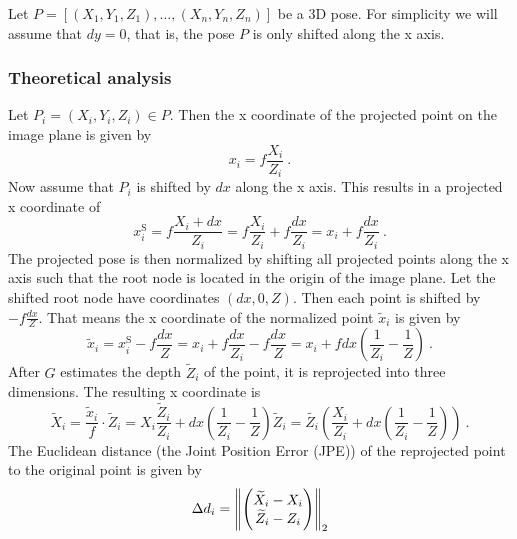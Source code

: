 Let $P = [(X_1, Y_1, Z_1), \dotsc, (X_n, Y_n, Z_n)]$ be a 3D pose.
For simplicity we will assume that $dy = 0$, that is, the pose $P$ is only shifted along the x axis.

\subsubsection{Theoretical analysis}
\label{sec:x-shift-error-theoretical}
Let $P_i = (X_i, Y_i, Z_i) \in P$.
Then the x coordinate of the projected point on the image plane is given by
\begin{equation}
	x_i = f \frac{X_i}{Z_i} \ .
\end{equation}
Now assume that $P_i$ is shifted by $dx$ along the x axis.
This results in a projected x coordinate of
\begin{equation}
	x_i^\mathrm{S} = f \frac{X_i + dx}{Z_i} = f \frac{X_i}{Z_i} + f \frac{dx}{Z_i} = x_i + f \frac{dx}{Z_i}\ .
\end{equation}
The projected pose is then normalized by shifting all projected points along the x axis such that the root node is located in the origin of the image plane.
Let the shifted root node have coordinates $(dx, 0, Z)$.
Then each point is shifted by $- f \frac{dx}{Z}$.
That means the x coordinate of the normalized point $\widetilde{x}_i$ is given by
\begin{equation}
	\widetilde{x}_i
	= x_i^\mathrm{S} - f \frac{dx}{Z}
	= x_i + f \frac{dx}{Z_i} - f \frac{dx}{Z}
	= x_i + f dx (\frac{1}{Z_i} - \frac{1}{Z})\ .
\end{equation}
After $G$ estimates the depth $\widetilde{Z}_i$ of the point, it is reprojected into three dimensions. The resulting x coordinate is 
\begin{equation}
	\label{eq:re-projected-X}
	\widetilde{X}_i = \frac{\widetilde{x}_i}{f} \cdot \widetilde{Z}_i
	= X_i \frac{\widetilde{Z}_i}{Z_i} + dx (\frac{1}{Z_i} - \frac{1}{Z}) \widetilde{Z}_i
	= \widetilde{Z_i} \left( \frac{X_i}{Z_i} + dx \left( \frac{1}{Z_i} - \frac{1}{Z} \right) \right ) \ .
\end{equation}
The Euclidean distance (the Joint Position Error (JPE)) of the reprojected point to the original point is given by
\begin{equation}
\label{eq:delta-d}
	\Delta d_i = \norm{ 
	\begin{pmatrix}
		\widetilde{X}_i - X_i \\
		\widetilde{Z}_i - Z_i
	\end{pmatrix}
	}_2
\end{equation}
